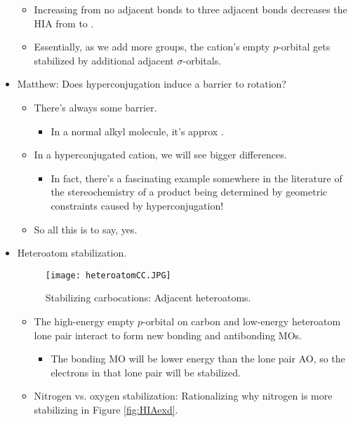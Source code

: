 \documentclass[../notes.tex]{subfiles}
\begin{document}
\begin{itemize}
    \begin{itemize}
        \item Increasing from no adjacent  bonds to three adjacent  bonds decreases the HIA from  to .
        \item Essentially, as we add more  groups, the cation's empty $p$-orbital gets stabilized by additional adjacent $\sigma$-orbitals.
    \end{itemize}
    \item Matthew: Does hyperconjugation induce a barrier to rotation?
    \begin{itemize}
        \item There's always some barrier.
        \begin{itemize}
            \item In a normal alkyl molecule, it's approx .
        \end{itemize}
        \item In a hyperconjugated cation, we will see bigger differences.
        \begin{itemize}
            \item In fact, there's a fascinating example somewhere in the literature of the stereochemistry of a product being determined by geometric constraints caused by hyperconjugation!
        \end{itemize}
        \item So all this is to say, yes.
    \end{itemize}
    \item Heteroatom stabilization.
    \begin{figure}[h!]
        \centering
        \texttt{[image: heteroatomCC.JPG]}
        \caption{Stabilizing carbocations: Adjacent heteroatoms.}
        \label{fig:heteroatomCC}
    \end{figure}
    \begin{itemize}
        \item The high-energy empty $p$-orbital on carbon and low-energy heteroatom lone pair interact to form new bonding and antibonding MOs.
        \begin{itemize}
            \item The bonding MO will be lower energy than the lone pair AO, so the electrons in that lone pair will be stabilized.
        \end{itemize}
        \item Nitrogen vs. oxygen stabilization: Rationalizing why nitrogen is more stabilizing in Figure \ref{fig:HIAexd}.

\end{itemize}
\end{itemize}
\end{document}
